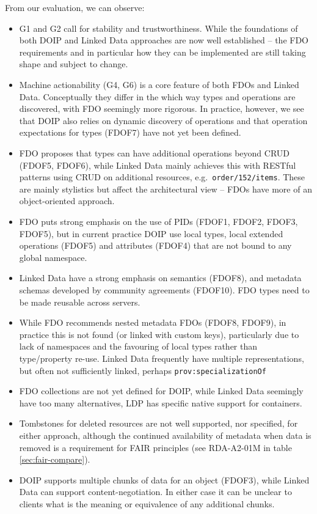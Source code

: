 \documentclass[fleqn,10pt,lineno]{wlpeerjlua}
\providecommand{\tightlist}{%
  \setlength{\itemsep}{0pt}\setlength{\parskip}{0pt}}
\begin{document}
From our evaluation, we can observe:

\begin{itemize}
\tightlist
\item
  G1 and G2 call for stability and trustworthiness. While the foundations of both DOIP and Linked Data approaches are now well established -- the FDO requirements and in particular how they can be implemented are still taking shape and subject to change.
\item
  Machine actionability (G4, G6) is a core feature of both FDOs and Linked Data. Conceptually they differ in the which way types and operations are discovered, with FDO seemingly more rigorous. In practice, however, we see that DOIP also relies on dynamic discovery of operations and that operation expectations for types (FDOF7) have not yet been defined.
\item
  FDO proposes that types can have additional operations beyond CRUD (FDOF5, FDOF6), while Linked Data mainly achieves this with RESTful patterns using CRUD on additional resources, e.g.~\texttt{order/152/items}. These are mainly stylistics but affect the architectural view -- FDOs have more of an object-oriented approach.
\item
  FDO puts strong emphasis on the use of PIDs (FDOF1, FDOF2, FDOF3, FDOF5), but in current practice DOIP use local types, local extended operations (FDOF5) and attributes (FDOF4) that are not bound to any global namespace.
\item
  Linked Data have a strong emphasis on semantics (FDOF8), and metadata schemas developed by community agreements (FDOF10). FDO types need to be made reusable across servers.
\item
  While FDO recommends nested metadata FDOs (FDOF8, FDOF9), in practice this is not found (or linked with custom keys), particularly due to lack of namespaces and the favouring of local types rather than type/property re-use. Linked Data frequently have multiple representations, but often not sufficiently linked, perhaps \texttt{prov:specializationOf} \cite{9T4j3N4e}
\item
  FDO collections are not yet defined for DOIP, while Linked Data seemingly have too many alternatives, LDP has specific native support for containers.
\item
  Tombstones for deleted resources are not well supported, nor specified, for either approach, although the continued availability of metadata when data is removed is a requirement for FAIR principles (see RDA-A2-01M in table \ref{sec:fair-compare}).
\item
  DOIP supports multiple chunks of data for an object (FDOF3), while Linked Data can support content-negotiation. In either case it can be unclear to clients what is the meaning or equivalence of any additional chunks.
\end{itemize}
\end{document}
